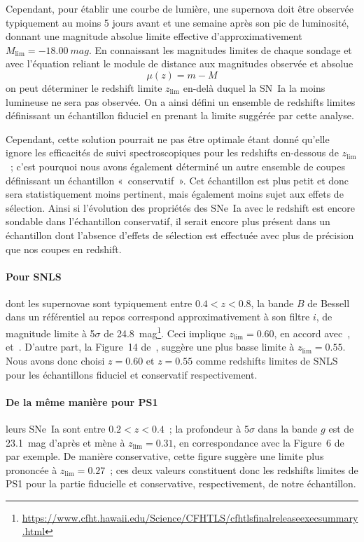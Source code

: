 \documentclass[../main/main.tex]{subfiles}
\begin{document}
Cependant, pour établir une courbe de lumière, une supernova doit être observée
typiquement au moins 5 jours avant et une semaine après son pic de luminosité,
donnant une magnitude absolue limite effective d'approximativement $M_{\lim}
= \SI{-18.00}{mag}$. En connaissant les magnitudes limites de chaque sondage et
avec l'équation reliant le module de distance aux magnitudes observée et
absolue
\begin{equation}\label{eq:distmod}
    \mu(z) = m - M
\end{equation}
on peut déterminer le redshift limite $z_{\lim}$ en-delà duquel la SN~Ia la
moins lumineuse ne sera pas observée. On a ainsi défini un ensemble de redshifts
limites définissant un échantillon fiduciel en prenant la limite suggérée par
cette analyse.

Cependant, cette solution pourrait ne pas être optimale étant donné qu'elle
ignore les efficacités de suivi spectroscopiques pour les redshifts en-dessous
de $z_{\lim}$~; c'est pourquoi nous avons également déterminé un autre ensemble
de coupes définissant un échantillon «~conservatif~». Cet échantillon est plus
petit et donc sera statistiquement moins pertinent, mais également moins sujet
aux effets de sélection. Ainsi si l'évolution des propriétés des SNe~Ia avec le
redshift est encore sondable dans l'échantillon conservatif, il serait encore
plus présent dans un échantillon dont l'absence d'effets de sélection est
effectuée avec plus de précision que nos coupes en redshift.

\paragraph*{Pour SNLS} dont les supernovae sont typiquement entre $0.4 < z <
0.8$, la bande $B$ de Bessell dans un référentiel au repos correspond
approximativement à son filtre $i$, de magnitude limite à 5$\sigma$ de
\SI{24.8}{mag}\footnote{\href{
    https://www.cfht.hawaii.edu/Science/CFHTLS/cfhtlsfinalreleaseexecsummary.html}
{https://www.cfht.hawaii.edu/Science/CFHTLS/cfhtlsfinalreleaseexecsummary.html}}.
Ceci implique $z_{\lim} = 0.60$, en accord avec~\cite{neill2006, perrett2010},
et~\citep[Section~2.2]{conley2011}. D'autre part, la Figure~14
de~\cite{perrett2010}, suggère une plus basse limite à $z_{\lim} = 0.55$. Nous
avons donc choisi $z=0.60$ et $z=0.55$ comme redshifts limites de SNLS pour les
échantillons fiduciel et conservatif respectivement.

\paragraph*{De la même manière pour PS1} leurs SNe~Ia sont entre $0.2 < z <
0.4$~; la profondeur à 5$\sigma$ dans la bande $g$ est de \SI{23.1}{mag} d'après
\cite{rest2014} et mène à $z_{\lim}=0.31$, en correspondance avec la Figure~6
de~\cite{scolnic2018} par exemple. De manière conservative, cette figure
suggère une limite plus prononcée à $z_{\lim}=0.27$~; ces deux valeurs
constituent donc les redshifts limites de PS1 pour la partie fiducielle et
conservative, respectivement, de notre échantillon.
\end{document}
